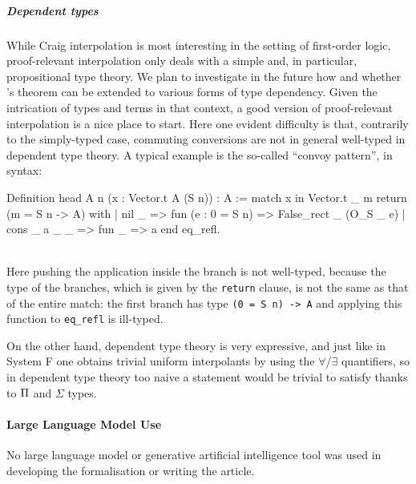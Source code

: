 \documentclass[a4paper,UKenglish,cleveref, autoref, thm-restate]{lipics-v2021}
\begin{document}
\subparagraph*{Dependent types} 
While Craig interpolation is most interesting in the setting of first-order logic,
\Cubric proof-relevant interpolation only deals with a simple and,
in particular, propositional type theory. 
We plan to investigate in the future how and whether \Cubric's theorem
can be extended to various forms of type dependency. Given the intrication of
types and terms in that context, a good version of proof-relevant interpolation
is a nice place to start. Here one evident difficulty is that, contrarily
to the simply-typed case, commuting conversions are not in general well-typed
in dependent type theory. A typical example is the so-called ``convoy pattern'',
in \Rocq syntax:\\
\begin{minipage}{\linewidth}
\begin{coq}
Definition head {A n} (x : Vector.t A (S n)) : A :=
  match x in Vector.t _ m return (m = S n -> A) with
    | nil _ => fun (e : 0 = S n) => False_rect _ (O_S _ e)
    | cons _ a _ _ => fun _ => a
  end eq_refl.
\end{coq}
\end{minipage}\\
Here pushing the application inside the branch is not well-typed, because
the type of the branches, which is given by the \texttt{return} clause,
is not the same as that of the entire match: the first branch has type
\texttt{(0 = S n) -> A} and applying this function to \texttt{eq\_refl} is
ill-typed.

On the other hand, dependent type theory is very expressive, and just like in
System F one obtains trivial uniform interpolants by using the
\(\forall\)/\(\exists\) quantifiers, so in dependent type theory
too naive a statement would be trivial to satisfy thanks to
\(\P\) and \(\Sigma\) types.

\paragraph*{Large Language Model Use}
No large language model or generative artificial intelligence tool was used in
developing the formalisation or writing the article.






\end{document}
